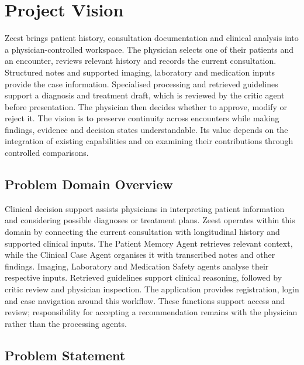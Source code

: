 \begingroup
\renewcommand{\encodingdefault}{T1}
\selectfont
\chapter{Project Vision}

Zeest brings patient history, consultation documentation and clinical analysis into a physician-controlled workspace. The physician selects one of their patients and an encounter, reviews relevant history and records the current consultation. Structured notes and supported imaging, laboratory and medication inputs provide the case information. Specialised processing and retrieved guidelines support a diagnosis and treatment draft, which is reviewed by the critic agent before presentation. The physician then decides whether to approve, modify or reject it. The vision is to preserve continuity across encounters while making findings, evidence and decision states understandable. Its value depends on the integration of existing capabilities and on examining their contributions through controlled comparisons.

\section{Problem Domain Overview}

Clinical decision support assists physicians in interpreting patient information and considering possible diagnoses or treatment plans. Zeest operates within this domain by connecting the current consultation with longitudinal history and supported clinical inputs. The Patient Memory Agent retrieves relevant context, while the Clinical Case Agent organises it with transcribed notes and other findings. Imaging, Laboratory and Medication Safety agents analyse their respective inputs. Retrieved guidelines support clinical reasoning, followed by critic review and physician inspection. The application provides registration, login and case navigation around this workflow. These functions support access and review; responsibility for accepting a recommendation remains with the physician rather than the processing agents.

\section{Problem Statement}

